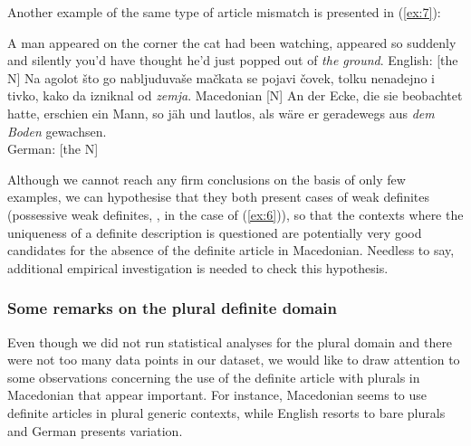 \documentclass[output=paper,colorlinks,citecolor=brown]{langscibook}
\begin{document}
\noindent Another example of the same type of article mismatch is presented in (\ref{ex:7}): 

\ea \label{ex:7} \ea A man appeared on the corner the cat had been watching, appeared so suddenly and silently you'd have thought he'd just popped out of \textit{the ground}. \hfill English: [the N]
\ex Na agolot \v{s}to go nabljuduva\v{s}e ma\v{c}kata se pojavi \v{c}ovek, tolku nenadejno i tivko, kako da izniknal od \textit{zemja}. \hfill Macedonian [N]
\ex An der Ecke, die sie beobachtet hatte, erschien ein Mann, so j\"{a}h und lautlos, als wäre er geradewegs aus \textit{dem Boden} gewachsen. \\
\hfill German: [the N]
\z \z

\noindent Although we cannot reach any firm conclusions on the basis of only few examples, we can hypothesise that they both present cases of weak definites (possessive weak definites, \citealt{Barker05}, in the case of (\ref{ex:6})), so that the contexts where the uniqueness of a definite description is questioned are potentially very good candidates for the absence of the definite article in Macedonian. Needless to say, additional empirical investigation is needed to check this hypothesis. 



\subsubsection{Some remarks on the plural definite domain} \label{McPl}

Even though we did not run statistical analyses for the plural domain and there were not too many data points in our dataset, we would like to draw attention to some observations concerning the use of the definite article with plurals in Macedonian that appear important. For instance, Macedonian seems to use definite articles in plural generic contexts, while English resorts to bare plurals and German presents variation.
\end{document}
